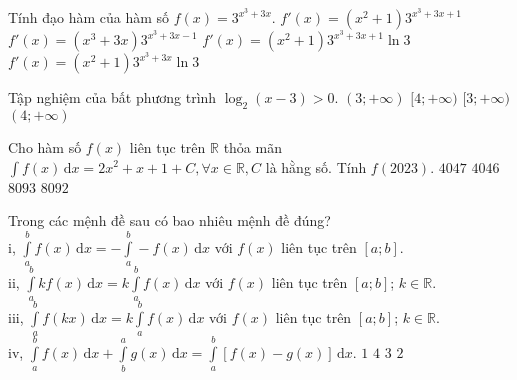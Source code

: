 \begin{ex}%
	Tính đạo hàm của hàm số $f(x)=3^{x^3+3x}$. 
	\choice
	{$f'(x)=\left(x^2+1\right)3^{x^3+3x+1}$}
	{$f'(x)=\left(x^3+3x\right)3^{x^3+3x-1}$}
	{\True $f'(x)=\left(x^2+1\right)3^{x^3+3x+1}\ln 3$}
	{$f'(x)=\left(x^2+1\right)3^{x^3+3x}\ln 3$}
\end{ex}

\begin{ex}%
	Tập nghiệm của bất phương trình $\log_2(x-3)>0$.
	\choice
	{$(3;+\infty)$}
	{$[4;+\infty)$}
	{$[3;+\infty)$}
	{\True $(4;+\infty)$}
\end{ex}

\begin{ex}%
	Cho hàm số $f(x)$ liên tục trên $\mathbb{R}$ thỏa mãn $\displaystyle\int f(x)\mathrm{\,d}x=2x^2+x+1+C,\forall x\in\mathbb{R},C$ là hằng số. Tính $f(2023)$. 
	\choice
	{$4047$}
	{$4046$}
	{\True $8093$}
	{$8092$}
\end{ex}

\begin{ex}%
	Trong các mệnh đề sau có bao nhiêu mệnh đề đúng?\\
	i, $\displaystyle\int\limits_a^b f(x)\mathrm{\,d}x=-\displaystyle\int\limits_a^b-f(x)\mathrm{\,d}x$ với $f(x)$ liên tục trên $[a;b]$.\\
	ii, $\displaystyle\int\limits_a^b kf(x)\mathrm{\,d}x=k\displaystyle\int\limits_a^b f(x)\mathrm{\,d}x$ với $f(x)$ liên tục trên $[a;b]$; $k\in\mathbb{R}$.\\
	iii, $\displaystyle\int\limits_a^b f(kx)\mathrm{\,d}x=k\displaystyle\int\limits_a^b f(x)\mathrm{\,d}x$ với $f(x)$ liên tục trên $[a;b]$; $k\in\mathbb{R}$.\\
	iv, $\displaystyle\int\limits_a^b f(x)\mathrm{\,d}x+\displaystyle\int\limits_b^a g(x)\mathrm{\,d}x=\displaystyle\int\limits_a^b[f(x)-g(x)]\mathrm{\,d}x$. 
	\choice
	{$1$}
	{$4$}
	{\True $3$}
	{$2$}
\end{ex}

